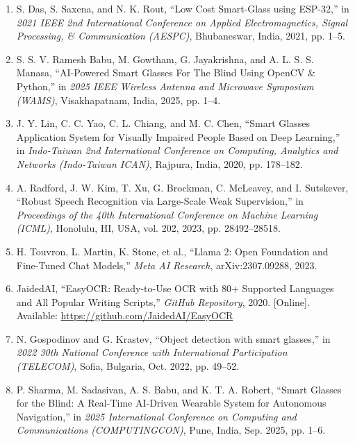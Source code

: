 \begin{enumerate}[leftmargin=1.5cm]
\item S. Das, S. Saxena, and N. K. Rout, ``Low Cost Smart-Glass using ESP-32,'' in \textit{2021 IEEE 2nd International Conference on Applied Electromagnetics, Signal Processing, \& Communication (AESPC)}, Bhubaneswar, India, 2021, pp. 1--5.

\item S. S. V. Ramesh Babu, M. Gowtham, G. Jayakrishna, and A. L. S. S. Manasa, ``AI-Powered Smart Glasses For The Blind Using OpenCV \& Python,'' in \textit{2025 IEEE Wireless Antenna and Microwave Symposium (WAMS)}, Visakhapatnam, India, 2025, pp. 1--4.

\item J. Y. Lin, C. C. Yao, C. L. Chiang, and M. C. Chen, ``Smart Glasses Application System for Visually Impaired People Based on Deep Learning,'' in \textit{Indo-Taiwan 2nd International Conference on Computing, Analytics and Networks (Indo-Taiwan ICAN)}, Rajpura, India, 2020, pp. 178--182.

\item A. Radford, J. W. Kim, T. Xu, G. Brockman, C. McLeavey, and I. Sutskever, ``Robust Speech Recognition via Large-Scale Weak Supervision,'' in \textit{Proceedings of the 40th International Conference on Machine Learning (ICML)}, Honolulu, HI, USA, vol. 202, 2023, pp. 28492--28518.

\item H. Touvron, L. Martin, K. Stone, et al., ``Llama 2: Open Foundation and Fine-Tuned Chat Models,'' \textit{Meta AI Research}, arXiv:2307.09288, 2023.

\item JaidedAI, ``EasyOCR: Ready-to-Use OCR with 80+ Supported Languages and All Popular Writing Scripts,'' \textit{GitHub Repository}, 2020. [Online]. Available: \url{https://github.com/JaidedAI/EasyOCR}

\item N. Gospodinov and G. Krastev, ``Object detection with smart glasses,'' in \textit{2022 30th National Conference with International Participation (TELECOM)}, Sofia, Bulgaria, Oct. 2022, pp. 49--52.

\item P. Sharma, M. Sadasivan, A. S. Babu, and K. T. A. Robert, ``Smart Glasses for the Blind: A Real-Time AI-Driven Wearable System for Autonomous Navigation,'' in \textit{2025 International Conference on Computing and Communications (COMPUTINGCON)}, Pune, India, Sep. 2025, pp. 1--6.


\end{enumerate}
